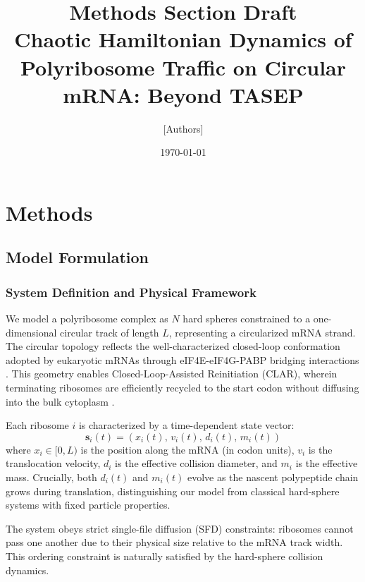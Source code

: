\documentclass[11pt]{article}
\title{\textbf{Methods Section Draft} \\ 
\large Chaotic Hamiltonian Dynamics of Polyribosome Traffic on Circular mRNA: Beyond TASEP}
\author{[Authors]}
\date{\today}
\begin{document}
\maketitle

\section{Methods}

\subsection{Model Formulation}

\subsubsection{System Definition and Physical Framework}

We model a polyribosome complex as $N$ hard spheres constrained to a one-dimensional circular track of length $L$, representing a circularized mRNA strand. The circular topology reflects the well-characterized closed-loop conformation adopted by eukaryotic mRNAs through eIF4E-eIF4G-PABP bridging interactions \cite{wells1998circularization, kahvejian2005mammalian}. This geometry enables Closed-Loop-Assisted Reinitiation (CLAR), wherein terminating ribosomes are efficiently recycled to the start codon without diffusing into the bulk cytoplasm \cite{vicens2018revisiting}.

Each ribosome $i$ is characterized by a time-dependent state vector:
\begin{equation}
    \mathbf{s}_i(t) = \left( x_i(t), \, v_i(t), \, d_i(t), \, m_i(t) \right)
\end{equation}
where $x_i \in [0, L)$ is the position along the mRNA (in codon units), $v_i$ is the translocation velocity, $d_i$ is the effective collision diameter, and $m_i$ is the effective mass. Crucially, both $d_i(t)$ and $m_i(t)$ evolve as the nascent polypeptide chain grows during translation, distinguishing our model from classical hard-sphere systems with fixed particle properties.

The system obeys strict single-file diffusion (SFD) constraints: ribosomes cannot pass one another due to their physical size relative to the mRNA track width. This ordering constraint is naturally satisfied by the hard-sphere collision dynamics.
\end{document}
